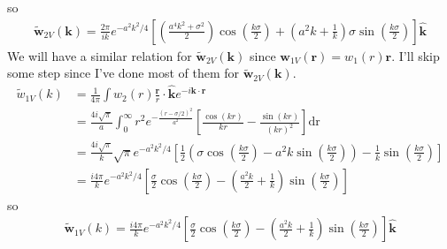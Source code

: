 \documentclass[letterpaper,twocolumn,amsmath,amssymb,prb]{revtex4-1}
\newcommand{\rr}{\textbf{r}}
\newcommand{\kk}{\textbf{k}}
\begin{document}
\begin{widetext}
so
\begin{align} 
  \tilde{\mathbf{w}}_{2V}(\kk) = \frac{2 \pi}{ik}e^{-a^2k^2/4}\left[ \left(\frac{a^4k^2 +
      \sigma^2}{2} \right) \cos\left(\frac{k\sigma}{2}\right) +
    \left(a^2k + \frac{1}{k} \right)\sigma \sin\left(\frac{k\sigma}{2}\right)
    \right] \mathbf{\hat{k}}
\end{align}
We will have a similar relation for $\tilde{\mathbf{w}}_{2V}(\kk)$
since $\mathbf{w}_{1V}(\rr) = w_1(r)\rr$.  I'll skip some step since
I've done most of them for $\tilde{\mathbf{w}}_{2V}(\kk)$.
\begin{align}
  \tilde{w}_{1V}(k) &= \frac{1}{4\pi}\int w_2(r)\frac{\rr}{r} \cdot \mathbf{\hat{k}} e^{-i\kk \cdot
  \rr} \\
  &= \frac{4i \sqrt{\pi}}{a}\int_0^\infty r^2
  e^{-\frac{(r-\sigma/2)^2}{a^2}} \left[ \frac{\cos(kr)}{kr}
    - \frac{\sin(kr)}{(kr)^2}\right] \mathrm{dr} \\
  &= \frac{4i \sqrt{\pi}}{k} \sqrt{\pi}e^{-a^2k^2/4} \left[
    \frac{1}{2} \left( \sigma \cos\left(\frac{k\sigma}{2}\right) - a^2k
    \sin\left(\frac{k\sigma}{2}\right) \right) -\frac{1}{k}
    \sin\left(\frac{k\sigma}{2}\right) \right] \\
  &= \frac{i4 \pi}{k} e^{-a^2k^2/4} \left[
    \frac{\sigma}{2} \cos\left(\frac{k\sigma}{2}\right) - \left( \frac{a^2k}{2}
    + \frac{1}{k} \right) \sin\left(\frac{k\sigma}{2}\right) \right]
\end{align}
so
\begin{align}
  \mathbf{\tilde{w}}_{1V}(k)= \frac{i4 \pi}{k} e^{-a^2k^2/4} \left[
    \frac{\sigma}{2} \cos\left(\frac{k\sigma}{2}\right) - \left( \frac{a^2k}{2}
    + \frac{1}{k} \right) \sin\left(\frac{k\sigma}{2}\right) \right]
  \mathbf{\hat{k}}
\end{align}
\end{widetext}

\end{document}
